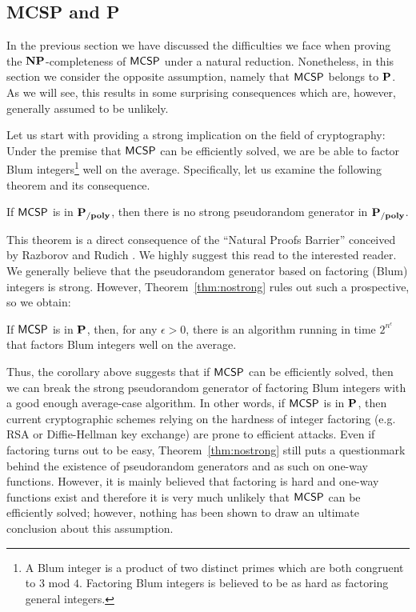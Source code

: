 \documentclass[11pt]{article}
\begin{document}
\subsection{MCSP and P}
\label{subsect:MCSP-P}
In the previous section we have discussed the difficulties we face when proving
the $\NP$-completeness of $\mathprob{MCSP}$ under a natural reduction.
Nonetheless, in this section we consider the opposite assumption, namely that $\mathprob{MCSP}$ belongs to $\P$. As we will see, this
results in some surprising consequences which are, however, generally assumed
to be unlikely.

Let us start with providing a strong implication on the field of cryptography:
Under the premise that
$\mathprob{MCSP}$ can be efficiently solved, we are be able to factor Blum
integers\footnote{A Blum integer is a product of two distinct primes which are both congruent to $3$ mod $4$. Factoring Blum integers is believed to be as hard as factoring general integers.}
well on the average.
Specifically, let us examine the following theorem and its consequence.

\begin{theorem}
  \label{thm:nostrong}
	If $\mathprob{MCSP}$ is in $\Ppoly$, then there is no strong pseudorandom
  generator in $\Ppoly$.
\end{theorem}

This theorem is a direct consequence of the ``Natural Proofs Barrier''
conceived by Razborov and Rudich \cite{10.1006/jcss.1997.1494}.
We highly suggest this read to the interested reader.
%
We generally believe that the pseudorandom generator based on factoring (Blum)
integers is strong.
However, Theorem~\ref{thm:nostrong} rules out such a prospective, so we obtain:

\begin{corollary}
	If $\mathprob{MCSP}$ is in $\P$, then, for any $\epsilon > 0$, there is an algorithm running in time $2^{n^{\epsilon}}$ that factors Blum integers well on the average.
\end{corollary}

Thus, the corollary above suggests that if $\mathprob{MCSP}$ can be efficiently
solved, then we can break the strong pseudorandom generator of factoring Blum
integers with a good enough average-case algorithm.
%
In other words, if $\mathprob{MCSP}$ is in $\P$, then current
cryptographic schemes relying on the hardness of integer factoring
(e.g. RSA or Diffie-Hellman key exchange) are prone to efficient
attacks.
%
Even if factoring turns out to be easy, Theorem~\ref{thm:nostrong} still puts a
questionmark behind the existence of pseudorandom generators and as such
on one-way functions.
%
However,
it is mainly believed that factoring is hard
and one-way functions exist
and therefore it is very much unlikely that $\mathprob{MCSP}$ can be efficiently
solved; however, nothing has been shown to draw an ultimate conclusion about
this assumption.
\end{document}

